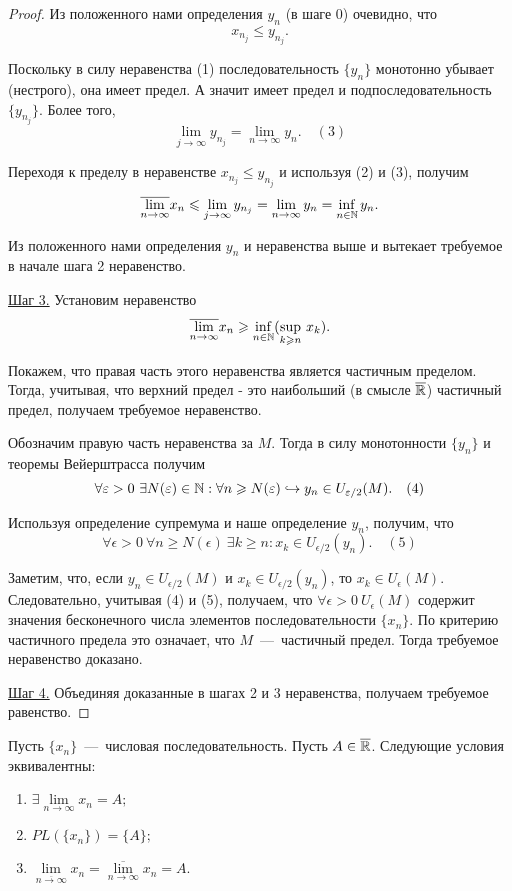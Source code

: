 \begin{proof}
    Из положенного нами определения $y_{n}$ (в шаге 0) очевидно, что
    $$ x_{n_{j}} \leq y_{n_{j}}.$$

    Поскольку в силу неравенства (1) последовательность $\{ y_{n} \}$ монотонно убывает (нестрого), она имеет предел. А значит имеет предел и подпоследовательность $\{ y_{n_{j}}\}$. Более того,
    $$ \lim\limits_{j\to \infty} y_{n_{j}} = \lim\limits_{n\to \infty} y_{n}. \quad (3)$$

    Переходя к пределу в неравенстве $x_{n_{j}} \leq y_{n_{j}}$ и используя (2) и (3), получим
    $$ \overline{\lim\limits_{n\to \infty}} x_{n} \leqslant \lim\limits_{j\to \infty} y_{n_{j}} = \lim\limits_{n\to \infty} y_{n} = \inf\limits_{n \in \mathbb{N}} y_{n}. $$

    Из положенного нами определения $y_{n}$ и неравенства выше и вытекает требуемое в начале шага 2 неравенство.

    \underline{Шаг 3.} Установим неравенство
    $$ \overline{\lim\limits_{n\to \infty}} x_{n} \geqslant \underset{n \in \mathbb{N}}{\inf} ({\sup\limits_{k \geqslant n}} \  x_{k}).$$

    Покажем, что правая часть этого неравенства является частичным пределом. Тогда, учитывая, что верхний предел - это наибольший (в смысле $\overline{\mathbb{R}}$) частичный предел, получаем требуемое неравенство.

    Обозначим правую часть неравенства за $M$. Тогда в силу монотонности $\{ y_{n} \}$ и теоремы Вейерштрасса получим
    $$ \forall \varepsilon > 0 \  \exists N (\varepsilon) \in \mathbb{N}: \forall n \geqslant N (\varepsilon) \hookrightarrow y_{n} \in U_{\varepsilon / 2} (M). \quad (4)$$

    Используя определение супремума и наше определение $y_{n}$, получим, что
    $$ \forall \epsilon > 0 \  \forall n \geq N (\epsilon) \  \exists k \geq n: x_{k} \in U_{\epsilon / 2} (y_{n}). \quad (5)$$

    Заметим, что, если $y_{n} \in U_{\epsilon / 2} (M)$ и $x_{k} \in U_{\epsilon / 2} (y_{n})$, то $x_{k} \in U_{\epsilon} (M)$. Следовательно, учитывая (4) и (5), получаем, что $\forall \epsilon > 0 \  U_{\epsilon} (M)$ содержит значения бесконечного числа элементов последовательности $\{ x_{n} \}$. По критерию частичного предела это означает, что $M$~---~частичный предел. Тогда требуемое неравенство доказано.

    \underline{Шаг 4.} Объединяя доказанные в шагах 2 и 3 неравенства, получаем требуемое равенство.
\end{proof}
\begin{theorem}
    Пусть $\{ x_{n} \}$~---~числовая последовательность. Пусть $A \in \overline{\mathbb{R}}$. Следующие условия эквивалентны:
    \begin{enumerate}
        \item $\exists \lim\limits_{n\to \infty} x_{n} = A;$
        \item $PL (\{ x_{n} \}) = \{ A \};$
        \item $ \lim\limits_{\overline{n\to \infty}} x_{n} = \overline{\lim\limits_{n\to \infty}} x_{n} = A.$
    \end{enumerate}
\end{theorem}
